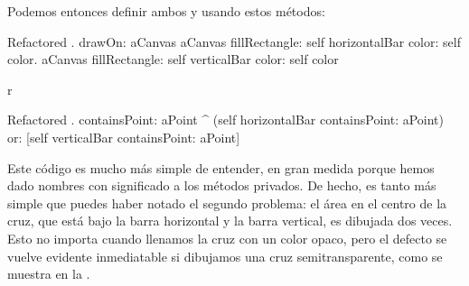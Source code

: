 \documentclass[a4paper,10pt,twoside]{book}
\begin{document}
\noindent
Podemos entonces definir ambos  y  usando estos m\'etodos:

\begin{method}{Refactored .}
drawOn: aCanvas 
	aCanvas fillRectangle: self horizontalBar color: self color.
	aCanvas fillRectangle: self verticalBar color: self color
\end{method}
r
\begin{method}{Refactored .}
containsPoint: aPoint 
	^ (self horizontalBar containsPoint: aPoint)
		or: [self verticalBar containsPoint: aPoint]
\end{method}

Este c\'odigo es mucho m\'as simple de entender, en gran medida porque hemos dado nombres con significado a los m\'etodos privados.
De hecho, es tanto m\'as simple que puedes haber notado el segundo problema: el \'area en el centro de la cruz, que est\'a bajo la barra horizontal y la barra vertical, es dibujada dos veces.
Esto no importa cuando llenamos la cruz con un color opaco, pero el defecto se vuelve evidente inmediatable si dibujamos una cruz semitransparente, como se muestra en la .
\end{document}
